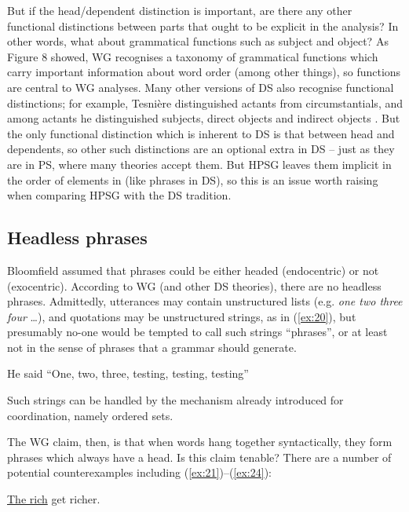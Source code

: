 \documentclass[output=paper]{langscibook}
\begin{document}
But if the head/dependent distinction is important, are there any other functional distinctions between parts that ought to be explicit in the analysis? In other words, what about grammatical functions such as subject and object? As Figure 8 showed, WG recognises a taxonomy of grammatical functions which carry important information about word order (among other things), so functions are central to WG analyses. Many other versions of DS also recognise functional distinctions; for example, Tesnière distinguished actants from circumstantials, and among actants he distinguished subjects, direct objects and indirect objects \citep[xlvii]{Tesniere2015a-u}. But the only functional distinction which is inherent to DS is that between head and dependents, so other such distinctions are an optional extra in DS – just as they are in PS, where many theories accept them. But HPSG leaves them implicit in the order of elements in \argst (like phrases in DS), so this is an issue worth raising when comparing HPSG with the DS tradition.


\subsection{Headless phrases}
\label{sec:5.1}

Bloomfield assumed that phrases could be either headed (endocentric) or not (exocentric). According to WG (and other DS theories), there are no headless phrases. Admittedly, utterances may contain unstructured lists (e.g. \emph{one two three four} \dots), and quotations may be unstructured strings, as in (\ref{ex:20}), but presumably no-one would be tempted to call such strings ``phrases'', or at least not in the sense of phrases that a grammar should generate.

\begin{exe}
	\ex \label{ex:20} He said ``One, two, three, testing, testing, testing''
\end{exe}

Such strings can be handled by the mechanism already introduced for coordination, namely ordered sets.

The WG claim, then, is that when words hang together syntactically, they form phrases which always have a head. Is this claim tenable? There are a number of potential counterexamples including (\ref{ex:21})--(\ref{ex:24}):

\settowidth{}
\eal
\ex \label{ex:21} \underline{The rich} get richer. 
\end{document}
